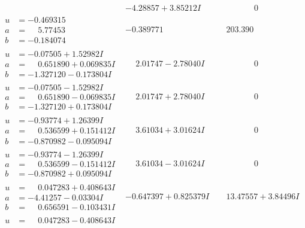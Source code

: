 \documentclass[1p]{elsarticle_modified}
\theoremstyle{definition}
\begin{document}
$$\begin{array}{c|c|c}
 & -4.28857 + 3.85212 I & \phantom{-0.000000 } 0 \\ \hline\begin{aligned}
u &= -0.469315\phantom{ +0.000000I} \\
a &= \phantom{-}5.77453\phantom{ +0.000000I} \\
b &= -0.184074\phantom{ +0.000000I}\end{aligned}
 & -0.389771\phantom{ +0.000000I} & \phantom{-}203.390\phantom{ +0.000000I} \\ \hline\begin{aligned}
u &= -0.07505 + 1.52982 I \\
a &= \phantom{-}0.651890 + 0.069835 I \\
b &= -1.327120 - 0.173804 I\end{aligned}
 & \phantom{-}2.01747 - 2.78040 I & \phantom{-0.000000 } 0 \\ \hline\begin{aligned}
u &= -0.07505 - 1.52982 I \\
a &= \phantom{-}0.651890 - 0.069835 I \\
b &= -1.327120 + 0.173804 I\end{aligned}
 & \phantom{-}2.01747 + 2.78040 I & \phantom{-0.000000 } 0 \\ \hline\begin{aligned}
u &= -0.93774 + 1.26399 I \\
a &= \phantom{-}0.536599 + 0.151412 I \\
b &= -0.870982 - 0.095094 I\end{aligned}
 & \phantom{-}3.61034 + 3.01624 I & \phantom{-0.000000 } 0 \\ \hline\begin{aligned}
u &= -0.93774 - 1.26399 I \\
a &= \phantom{-}0.536599 - 0.151412 I \\
b &= -0.870982 + 0.095094 I\end{aligned}
 & \phantom{-}3.61034 - 3.01624 I & \phantom{-0.000000 } 0 \\ \hline\begin{aligned}
u &= \phantom{-}0.047283 + 0.408643 I \\
a &= -4.41257 - 0.03304 I \\
b &= \phantom{-}0.656591 - 0.103431 I\end{aligned}
 & -0.647397 + 0.825379 I & \phantom{-}13.47557 + 3.84496 I \\ \hline\begin{aligned}
u &= \phantom{-}0.047283 - 0.408643 I \\

\end{aligned}
\end{array}$$
\end{document}
